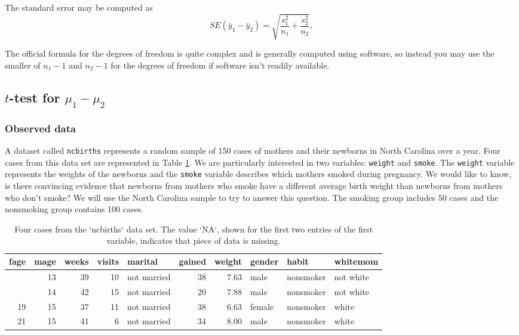 \documentclass[
  10pt,
  openany]{book}
\theoremstyle{definition}
\theoremstyle{definition}
\theoremstyle{definition}
\theoremstyle{definition}
\theoremstyle{remark}
\begin{document}
The standard error may be computed as
\[
SE(\bar{y}_1 - \bar{y}_2) = \sqrt{\frac{s_1^2}{n_1} + \frac{s_2^2}{n_2}},
\]

The official formula for the degrees of freedom is quite
complex and is generally computed using software,
so instead you may use the smaller of
\(n_1 - 1\) and \(n_2 - 1\) for the degrees of freedom
if software isn't readily available.


\subsection{\texorpdfstring{\(t\)-test for \(\mu_1 - \mu_2\)}{t-test for \textbackslash mu\_1 - \textbackslash mu\_2}}\label{t-test-for-mu_1---mu_2}

\subsubsection*{Observed data}\label{observed-data-12}


A dataset called \texttt{ncbirths} represents a random sample of 150 cases of mothers and their newborns in North Carolina over a year. Four cases from this data set are represented in Table \ref{tab:babySmokeDF}. We are particularly interested in two variables: \texttt{weight} and \texttt{smoke}. The \texttt{weight} variable represents the weights of the newborns and the \texttt{smoke} variable describes which mothers smoked during pregnancy. We would like to know, is there convincing evidence that newborns from mothers who smoke have a different average birth weight than newborns from mothers who don't smoke? We will use the North Carolina sample to try to answer this question. The smoking group includes 50 cases and the nonsmoking group contains 100 cases.

\begin{table}
\centering
\caption{\label{tab:babySmokeDF}Four cases from the `ncbirths` data set. The value `NA`, shown for the first two entries of the first variable, indicates that piece of data is missing.}
\centering
\begin{tabular}[t]{r|r|r|r|l|r|r|l|l|l}
\hline
fage & mage & weeks & visits & marital & gained & weight & gender & habit & whitemom\\
\hline
 & 13 & 39 & 10 & not married & 38 & 7.63 & male & nonsmoker & not white\\
\hline
 & 14 & 42 & 15 & not married & 20 & 7.88 & male & nonsmoker & not white\\
\hline
19 & 15 & 37 & 11 & not married & 38 & 6.63 & female & nonsmoker & white\\
\hline
21 & 15 & 41 & 6 & not married & 34 & 8.00 & male & nonsmoker & white\\
\hline
\end{tabular}
\end{table}
\end{document}
